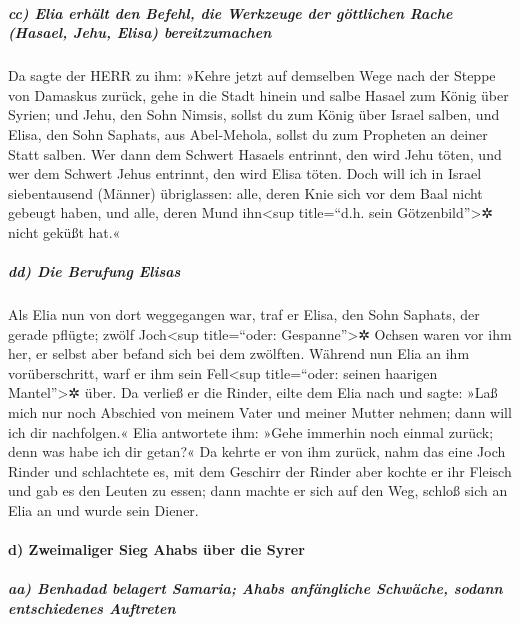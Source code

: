 \hypertarget{cc-elia-erhuxe4lt-den-befehl-die-werkzeuge-der-guxf6ttlichen-rache-hasael-jehu-elisa-bereitzumachen}{%
\subparagraph{cc) Elia erhält den Befehl, die Werkzeuge der göttlichen
Rache (Hasael, Jehu, Elisa)
bereitzumachen}\label{cc-elia-erhuxe4lt-den-befehl-die-werkzeuge-der-guxf6ttlichen-rache-hasael-jehu-elisa-bereitzumachen}}

Da sagte der HERR zu ihm: »Kehre jetzt auf demselben Wege
nach der Steppe von Damaskus zurück, gehe in die Stadt hinein und salbe
Hasael zum König über Syrien; und Jehu, den Sohn Nimsis,
sollst du zum König über Israel salben, und Elisa, den Sohn Saphats, aus
Abel-Mehola, sollst du zum Propheten an deiner Statt salben.
Wer dann dem Schwert Hasaels entrinnt, den wird Jehu
töten, und wer dem Schwert Jehus entrinnt, den wird Elisa töten.
Doch will ich in Israel siebentausend (Männer)
übriglassen: alle, deren Knie sich vor dem Baal nicht gebeugt haben, und
alle, deren Mund ihn\textless sup title=``d.h. sein
Götzenbild''\textgreater✲ nicht geküßt hat.«

\hypertarget{dd-die-berufung-elisas}{%
\subparagraph{dd) Die Berufung Elisas}\label{dd-die-berufung-elisas}}

Als Elia nun von dort weggegangen war, traf er Elisa, den
Sohn Saphats, der gerade pflügte; zwölf Joch\textless sup title=``oder:
Gespanne''\textgreater✲ Ochsen waren vor ihm her, er selbst aber befand
sich bei dem zwölften. Während nun Elia an ihm vorüberschritt, warf er
ihm sein Fell\textless sup title=``oder: seinen haarigen
Mantel''\textgreater✲ über. Da verließ er die Rinder,
eilte dem Elia nach und sagte: »Laß mich nur noch Abschied von meinem
Vater und meiner Mutter nehmen; dann will ich dir nachfolgen.« Elia
antwortete ihm: »Gehe immerhin noch einmal zurück; denn was habe ich dir
getan?« Da kehrte er von ihm zurück, nahm das eine Joch
Rinder und schlachtete es, mit dem Geschirr der Rinder aber kochte er
ihr Fleisch und gab es den Leuten zu essen; dann machte er sich auf den
Weg, schloß sich an Elia an und wurde sein Diener.

\hypertarget{d-zweimaliger-sieg-ahabs-uxfcber-die-syrer}{%
\paragraph{d) Zweimaliger Sieg Ahabs über die
Syrer}\label{d-zweimaliger-sieg-ahabs-uxfcber-die-syrer}}

\hypertarget{aa-benhadad-belagert-samaria-ahabs-anfuxe4ngliche-schwuxe4che-sodann-entschiedenes-auftreten}{%
\subparagraph{aa) Benhadad belagert Samaria; Ahabs anfängliche Schwäche,
sodann entschiedenes
Auftreten}\label{aa-benhadad-belagert-samaria-ahabs-anfuxe4ngliche-schwuxe4che-sodann-entschiedenes-auftreten}}

